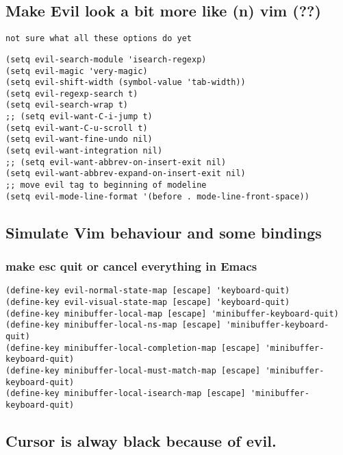 \documentclass[11pt]{article}
\begin{document}
\subsection*{Make Evil look a bit more like (n) vim  (??)}
\label{sec:org4d08759}
\begin{verbatim}
not sure what all these options do yet
\end{verbatim}

\begin{verbatim}
(setq evil-search-module 'isearch-regexp)
(setq evil-magic 'very-magic)
(setq evil-shift-width (symbol-value 'tab-width))
(setq evil-regexp-search t)
(setq evil-search-wrap t)
;; (setq evil-want-C-i-jump t)
(setq evil-want-C-u-scroll t)
(setq evil-want-fine-undo nil)
(setq evil-want-integration nil)
;; (setq evil-want-abbrev-on-insert-exit nil)
(setq evil-want-abbrev-expand-on-insert-exit nil)
;; move evil tag to beginning of modeline
(setq evil-mode-line-format '(before . mode-line-front-space))
\end{verbatim}




\subsection*{Simulate Vim behaviour and some bindings}
\label{sec:org49d9156}


\subsubsection*{make esc quit or cancel everything in Emacs}
\label{sec:orgefba423}
\begin{verbatim}
(define-key evil-normal-state-map [escape] 'keyboard-quit)
(define-key evil-visual-state-map [escape] 'keyboard-quit)
(define-key minibuffer-local-map [escape] 'minibuffer-keyboard-quit)
(define-key minibuffer-local-ns-map [escape] 'minibuffer-keyboard-quit)
(define-key minibuffer-local-completion-map [escape] 'minibuffer-keyboard-quit)
(define-key minibuffer-local-must-match-map [escape] 'minibuffer-keyboard-quit)
(define-key minibuffer-local-isearch-map [escape] 'minibuffer-keyboard-quit)
\end{verbatim}




\subsection*{Cursor is alway black because of evil.}
\label{sec:org328acd5}
\end{document}
